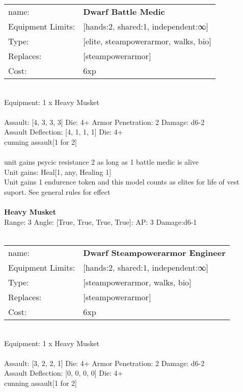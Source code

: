 \noindent
\begin{tabular}{ll}
name: &{\bf Dwarf Battle Medic } \\
Equipment Limits: &[hands:2, shared:1, independent:∞] \\
Type: &[elite, steampowerarmor, walks, bio] \\
Replaces: &[steampowerarmor] \\
Cost: & 6xp\\
\end{tabular}
\ \\
Equipment: 1 x Heavy Musket \\
\ \\
Assault: [4, 3, 3, 3] Die: 4+ Armor Penetration: 2 Damage: d6-2 \\
Assault Deflection: [4, 1, 1, 1] Die: 4+\\
\indent cunning assault[1 for 2]\\ 
 
\ \\
unit gains psycic resistance 2 as long as 1 battle medic is alive\\ 
Unit gains: Heal[1, any, Healing 1]\\ 
Unit gains 1 endurence token and this model counts as elites for life of vest suport. See general rules for effect\\ 

\ \\
{\bf Heavy Musket } \\



Range: 3  Angle: [True, True, True, True]: AP: 3 Damage:d6-1 \\




 
\ \\

\noindent
\begin{tabular}{ll}
name: &{\bf Dwarf Steampowerarmor Engineer } \\
Equipment Limits: &[hands:2, shared:1, independent:∞] \\
Type: &[steampowerarmor, walks, bio] \\
Replaces: &[steampowerarmor] \\
Cost: & 6xp\\
\end{tabular}
\ \\
Equipment: 1 x Heavy Musket \\
\ \\
Assault: [3, 2, 2, 1] Die: 4+ Armor Penetration: 2 Damage: d6-2 \\
Assault Deflection: [0, 0, 0, 0] Die: 4+\\
\indent cunning assault[1 for 2]\\ 
 
